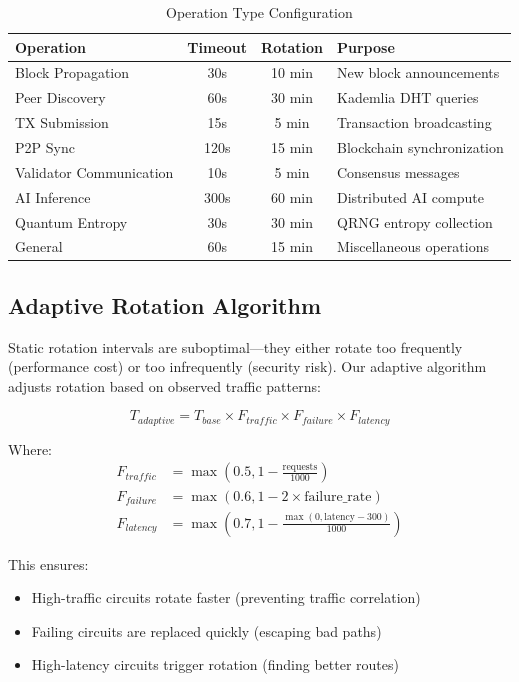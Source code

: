 \documentclass[11pt,a4paper]{article}
\begin{document}
\begin{table}[H]
\centering
\caption{Operation Type Configuration}
\label{tab:operations}
\begin{tabular}{@{}lccl@{}}
\toprule
\textbf{Operation} & \textbf{Timeout} & \textbf{Rotation} & \textbf{Purpose} \\
\midrule
Block Propagation & 30s & 10 min & New block announcements \\
Peer Discovery & 60s & 30 min & Kademlia DHT queries \\
TX Submission & 15s & 5 min & Transaction broadcasting \\
P2P Sync & 120s & 15 min & Blockchain synchronization \\
Validator Communication & 10s & 5 min & Consensus messages \\
AI Inference & 300s & 60 min & Distributed AI compute \\
Quantum Entropy & 30s & 30 min & QRNG entropy collection \\
General & 60s & 15 min & Miscellaneous operations \\
\bottomrule
\end{tabular}
\end{table}

\subsection{Adaptive Rotation Algorithm}

Static rotation intervals are suboptimal---they either rotate too frequently (performance cost) or too infrequently (security risk). Our adaptive algorithm adjusts rotation based on observed traffic patterns:

\begin{equation}
T_{adaptive} = T_{base} \times F_{traffic} \times F_{failure} \times F_{latency}
\end{equation}

Where:
\begin{align}
F_{traffic} &= \max\left(0.5, 1 - \frac{\text{requests}}{1000}\right) \\
F_{failure} &= \max\left(0.6, 1 - 2 \times \text{failure\_rate}\right) \\
F_{latency} &= \max\left(0.7, 1 - \frac{\max(0, \text{latency} - 300)}{1000}\right)
\end{align}

This ensures:
\begin{itemize}[leftmargin=*]
    \item High-traffic circuits rotate faster (preventing traffic correlation)
    \item Failing circuits are replaced quickly (escaping bad paths)
    \item High-latency circuits trigger rotation (finding better routes)
\end{itemize}
\end{document}
